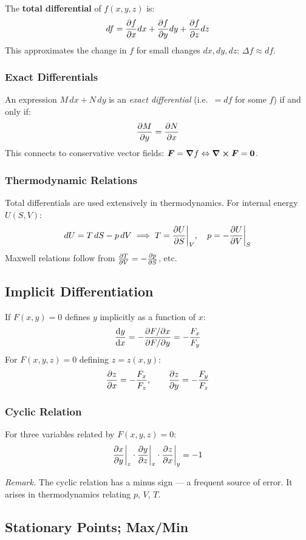 \documentclass[11pt, letterpaper]{article}
\theoremstyle{plain}
\newenvironment{remark}{\smallskip\noindent\textit{Remark.}}{\smallskip}
\newcommand{\vv}[1]{\bm{#1}}
\begin{document}
The \textbf{total differential} of $f(x,y,z)$ is:
\[
    df = \pdv{f}{x}dx + \pdv{f}{y}dy + \pdv{f}{z}dz
\]
This approximates the change in $f$ for small changes $dx, dy, dz$:
$\Delta f \approx df$.

\subsubsection*{Exact Differentials}
An expression $M\,dx + N\,dy$ is an \emph{exact differential} (i.e.\
$= df$ for some $f$) if and only if:
\[
    \pdv{M}{y} = \pdv{N}{x}
\]
This connects to conservative vector fields: $\vv{F} = \grad f \Leftrightarrow
\curl\vv{F} = \vv{0}$.

\subsubsection*{Thermodynamic Relations}
Total differentials are used extensively in thermodynamics. For internal
energy $U(S,V)$:
\[
    dU = T\,dS - p\,dV \implies
    T = \pdv{U}{S}\bigg|_V, \quad p = -\pdv{U}{V}\bigg|_S
\]
Maxwell relations follow from $\pdv{T}{V} = -\pdv{p}{S}$, etc.


\subsection{Implicit Differentiation}

If $F(x,y) = 0$ defines $y$ implicitly as a function of $x$:
\[
    \dv{y}{x} = -\frac{\partial F/\partial x}{\partial F/\partial y}
    = -\frac{F_x}{F_y}
\]
For $F(x,y,z) = 0$ defining $z = z(x,y)$:
\[
    \pdv{z}{x} = -\frac{F_x}{F_z}, \qquad
    \pdv{z}{y} = -\frac{F_y}{F_z}
\]

\subsubsection*{Cyclic Relation}
For three variables related by $F(x,y,z) = 0$:
\[
    \pdv{x}{y}\bigg|_z \cdot \pdv{y}{z}\bigg|_x \cdot \pdv{z}{x}\bigg|_y = -1
\]

\begin{remark}
    The cyclic relation has a minus sign — a frequent source of error.
    It arises in thermodynamics relating $p$, $V$, $T$.
\end{remark}


\subsection{Stationary Points; Max/Min}
\end{document}
